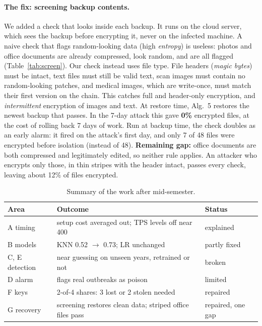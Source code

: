 \documentclass[11pt]{article}
\begin{document}
\paragraph{The fix: screening backup contents.} We added a check that looks inside each backup. It
runs on the cloud server, which sees the backup before encrypting it, never on the infected
machine. A naive check that flags random-looking data (high \emph{entropy}) is useless: photos and
office documents are already compressed, look random, and are all flagged
(Table~\ref{tab:screen}). Our check instead uses file type. File headers (\emph{magic bytes}) must be
intact, text files must still be valid text, scan images must contain no random-looking patches,
and medical images, which are write-once, must match their first version on the chain. This
catches full and header-only encryption, and \emph{intermittent} encryption of images and text.
At restore time, Alg.~5 restores the newest backup that passes. In the 7-day attack this gave
\textbf{0\%} encrypted files, at the cost of rolling back 7 days of work. Run at backup time, the
check doubles as an early alarm: it fired on the attack's first day, and only 7 of 48 files were
encrypted before isolation (instead of 48). \textbf{Remaining gap:} office documents are both
compressed and legitimately edited, so neither rule applies. An attacker who encrypts only those,
in thin stripes with the header intact, passes every check, leaving about 12\% of files encrypted.

\begin{table}[t]
\centering
\small
\begin{tabular}{@{}p{1.55cm}p{3.6cm}p{1.45cm}@{}}
\toprule
\textbf{Area} & \textbf{Outcome} & \textbf{Status} \\
\midrule
A timing & setup cost averaged out; TPS levels off near 400 & explained \\
B models & KNN 0.52 $\to$ 0.73; LR unchanged & partly fixed \\
C, E detection & near guessing on unseen years, retrained or not & broken \\
D alarm & flags real outbreaks as poison & limited \\
F keys & 2-of-4 shares: 3 lost or 2 stolen needed & repaired \\
G recovery & screening restores clean data; striped office files pass & repaired, one gap \\
\bottomrule
\end{tabular}
\caption{Summary of the work after mid-semester.}
\label{tab:summary}
\end{table}
\end{document}

